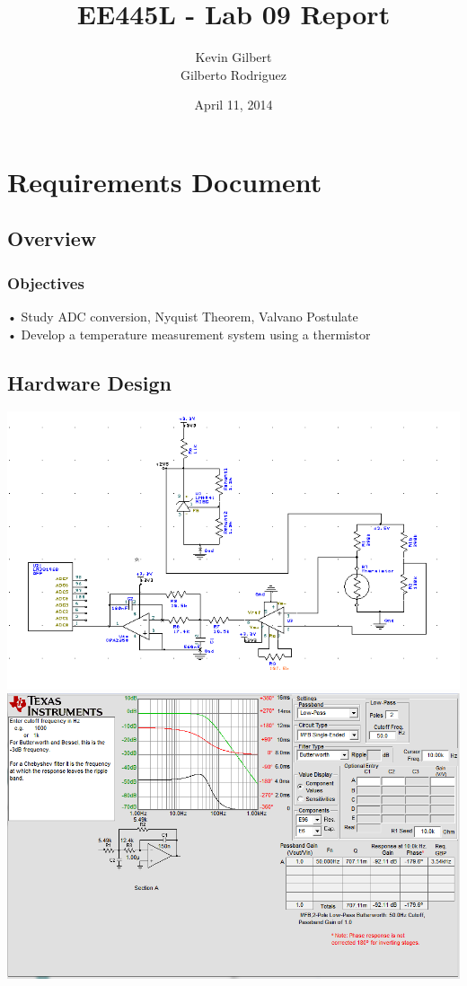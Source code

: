 \documentclass[twoside]{article}
\title{EE445L - Lab 09 Report}
\author{Kevin Gilbert\\ Gilberto Rodriguez}
\date{April 11, 2014}
\begin{document}
\raggedbottom
\maketitle{}

\section{Requirements Document}
\subsection{Overview}
\subsubsection{Objectives}
• Study ADC conversion, Nyquist Theorem, Valvano Postulate\\
• Develop a temperature measurement system using a thermistor 

\subsection{Hardware Design} 
\includegraphics[width=\textwidth]{Lab9_schematic}
\vskip 0.1in
\includegraphics[width=\textwidth]{butterworthFilter}
\end{document}
